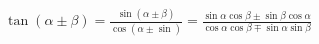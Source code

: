 \documentclass[preview]{standalone}
\begin{document}
\begin{align*}
\tan(\alpha \pm \beta) = \frac{\sin(\alpha\pm\beta)}{\cos(\alpha\pm\sin)} = \frac{\sin\alpha\cos\beta\pm\sin\beta\cos\alpha}{\cos\alpha\cos\beta\mp\sin\alpha\sin\beta}
\end{align*}
\end{document}
